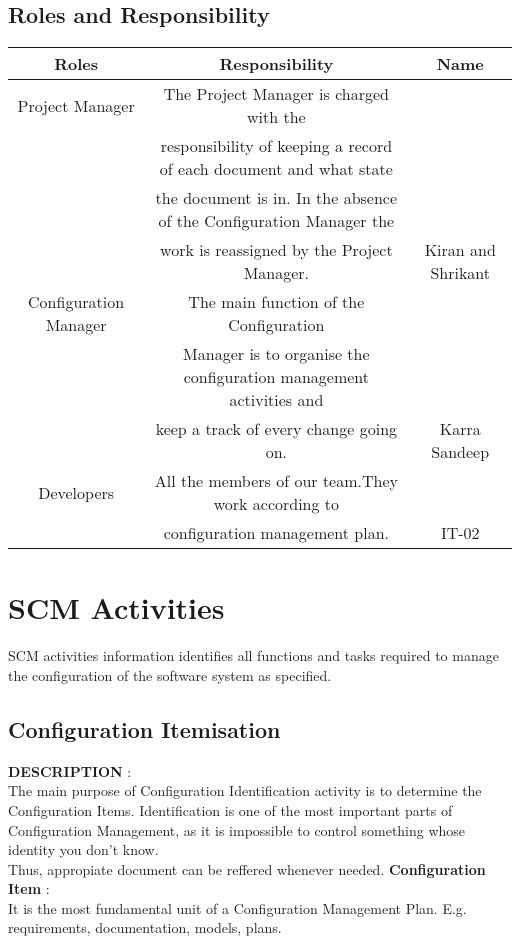 \documentclass[12pt]{article}
\begin{document}
\subsection{Roles and Responsibility}
\begin{tabular}{|c|c|c|}
    \hline
    Roles & Responsibility & Name
\\  \hline
    Project Manager & The Project Manager is charged with the \\
    
    &  responsibility of keeping a record of each document and what state
\\    
    & the document is in. In the absence of the Configuration Manager the
  \\  
    & work is reassigned by the Project Manager. & Kiran and Shrikant
    \\ \hline
    Configuration Manager & The main function of the Configuration \\
    
    & Manager is to organise the configuration management activities and 
    \\
    & keep a track of every change going on. & Karra Sandeep
    \\ \hline
    Developers & All the members of our team.They work according to 
    \\
    & configuration management plan. & IT-02
    \\ \hline
    \end{tabular}
    
\section{SCM Activities}
SCM activities information identifies all functions and tasks required to manage the configuration of the software system as specified.
\subsection{Configuration Itemisation}
\textbf{DESCRIPTION} : \\
The main purpose of Configuration Identification activity is to determine the Configuration Items. Identification is one of the most important parts of Configuration Management, as it is impossible to control something whose identity you don't know.\\
Thus, appropiate document can be reffered whenever needed.
\textbf{Configuration Item} : \\
It is the most fundamental unit of a Configuration Management Plan. E.g. requirements, documentation, models, plans.
\end{document}
